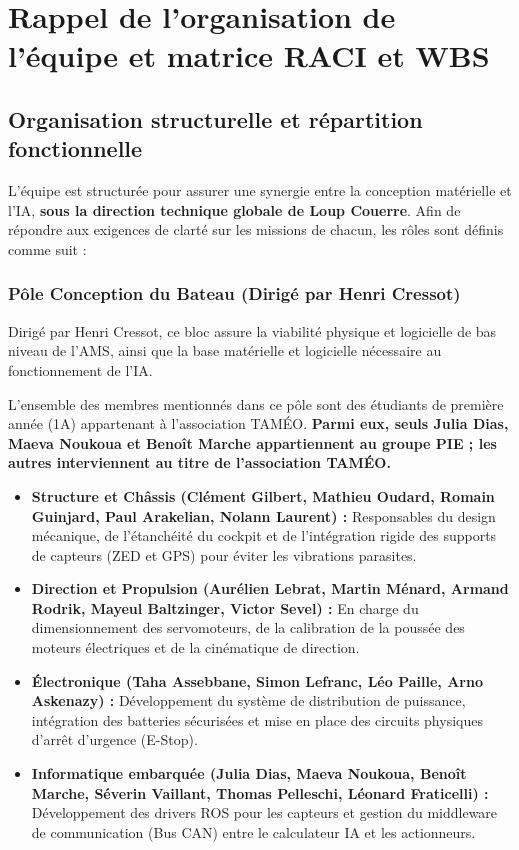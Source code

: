\documentclass[11pt,letterpaper]{article}
\begin{document}
\section{Rappel de l’organisation de l’équipe et matrice RACI et WBS}
\subsection{Organisation structurelle et répartition fonctionnelle}
L'équipe est structurée pour assurer une synergie entre la conception matérielle 
et l'IA, \textbf{sous la direction technique globale de Loup Couerre}. 
Afin de répondre aux exigences de clarté sur les missions de chacun, les 
rôles sont définis comme suit :

\subsubsection{Pôle Conception du Bateau (Dirigé par Henri Cressot)}
Dirigé par Henri Cressot, ce bloc assure la viabilité physique et logicielle de bas niveau de l'AMS, ainsi que la base matérielle et logicielle nécessaire au fonctionnement de l'IA.

L'ensemble des membres mentionnés dans ce pôle sont des étudiants de première année (1A) 
appartenant à l'association TAMÉO. \textbf{Parmi eux, seuls Julia Dias, Maeva Noukoua et Benoît Marche appartiennent au groupe PIE ; les autres interviennent au titre de l'association TAMÉO.}

\begin{itemize}
    \item \textbf{Structure et Châssis (Clément Gilbert, Mathieu Oudard, Romain Guinjard, Paul Arakelian, Nolann Laurent) :} Responsables du design mécanique, de l'étanchéité du cockpit et de l'intégration rigide des supports de capteurs (ZED et GPS) pour éviter les vibrations parasites.
    \item \textbf{Direction et Propulsion (Aurélien Lebrat, Martin Ménard, Armand Rodrik, Mayeul Baltzinger, Victor Sevel) :} En charge du dimensionnement des servomoteurs, de la calibration de la poussée des moteurs électriques et de la cinématique de direction.
    \item \textbf{Électronique (Taha Assebbane, Simon Lefranc, Léo Paille, Arno Askenazy) :} Développement du système de distribution de puissance, intégration des batteries sécurisées et mise en place des circuits physiques d'arrêt d'urgence (E-Stop).
    \item \textbf{Informatique embarquée (Julia Dias, Maeva Noukoua, Benoît Marche, Séverin Vaillant, Thomas Pelleschi, Léonard Fraticelli) :} Développement des drivers ROS pour les capteurs et gestion du middleware de communication (Bus CAN) entre le calculateur IA et les actionneurs.
\end{itemize}
\end{document}

